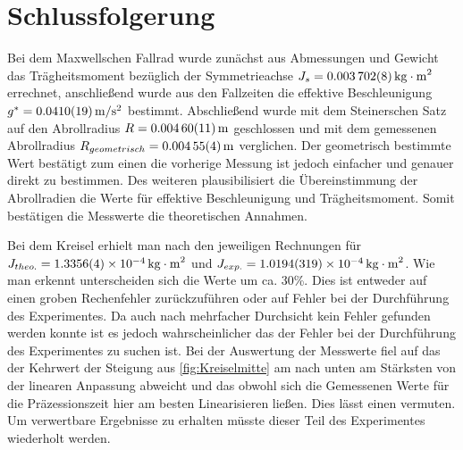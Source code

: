 \clearpage
\section{Schlussfolgerung}

Bei dem Maxwellschen Fallrad wurde zunächst aus Abmessungen und Gewicht das Trägheitsmoment bezüglich der Symmetrieachse $J_s=\SI{0.003702 \pm 0.000008}{kg\cdot m^2}$ errechnet, anschließend wurde aus den Fallzeiten die effektive Beschleunigung  $g^*=\SI{0.0410 \pm  0.0019}{m \per s \squared}$ bestimmt. Abschließend wurde mit dem Steinerschen Satz auf den Abrollradius $R=\SI{0.00460\pm 0.00011}{m}$ geschlossen und mit dem gemessenen Abrollradius $R_{geometrisch}=\SI{0.00455 \pm 0.00004}{m}$ verglichen. Der geometrisch bestimmte Wert bestätigt zum einen die vorherige Messung ist jedoch einfacher und genauer direkt zu bestimmen. Des weiteren plausibilisiert die Übereinstimmung der Abrollradien die Werte für effektive Beschleunigung und Trägheitsmoment. Somit bestätigen die Messwerte die theoretischen Annahmen.

Bei dem Kreisel erhielt man nach den jeweiligen Rechnungen für \\
 $J_{theo.}=\SI{1,3356+-0,0004e-4}{kg \cdot m^2}$ und $J_{exp.}=\SI{1,0194+-0,0319e-4}{kg \cdot m^2}$. Wie man erkennt unterscheiden sich die Werte um ca. 30\%.
Dies ist entweder auf einen groben Rechenfehler zurückzuführen oder auf Fehler bei der Durchführung des Experimentes. Da auch nach mehrfacher Durchsicht kein Fehler gefunden werden konnte ist es jedoch wahrscheinlicher das der Fehler bei der Durchführung des Experimentes zu suchen ist. Bei der Auswertung der Messwerte fiel auf das der Kehrwert der Steigung aus \cref{fig:Kreiselmitte} am nach unten am Stärksten von der linearen Anpassung abweicht und das obwohl sich die Gemessenen Werte für die Präzessionszeit hier am besten Linearisieren ließen. Dies lässt einen %
vermuten. Um verwertbare Ergebnisse zu erhalten müsste dieser Teil des Experimentes wiederholt werden.








